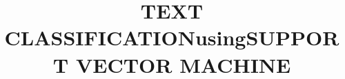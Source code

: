 \documentclass{report}
\begin{document}
\pagebreak

{ \doublespacing
{}
\tableofcontents %
\pagebreak
\listoffigures %
\pagebreak
\listoftables %
}

\title{\Huge  TEXT CLASSIFICATION\linebreak using\linebreak SUPPORT VECTOR MACHINE}
\date{}
\maketitle
\setcounter{tocdepth}{5} 	
\setlength{\columnsep}{0.7cm}
\end{document}
